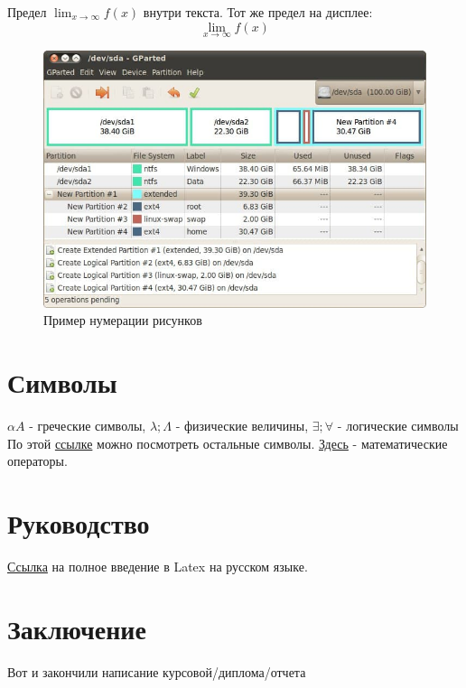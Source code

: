     Предел \(\lim_{x\to\infty} f(x)\) внутри текста.
    Тот же предел на дисплее:
    \[
    \lim_{x\to\infty} f(x)
    \]
\begin{figure}[!htb]
	\centering
	\includegraphics[width=\textwidth]{Images/image2.jpg}
	\caption{Пример нумерации рисунков}
	\label{fig:image2}
\end{figure}

\section{Символы}
$\alpha A$ - греческие символы,  $ \lambda; \Lambda$ - физические величины, $\exists; \forall$ - логические символы\\
По этой   \href{https://www.overleaf.com/learn/latex/List_of_Greek_letters_and_math_symbols}{ссылке} можно посмотреть остальные символы. \href{https://www.overleaf.com/learn/latex/Operators}{Здесь} - математические операторы.


\section{Руководство}
\href{https://www.texlive.info/CTAN/info/lshort/russian/lshortru.pdf}{Ссылка} на полное введение в Latex на русском языке.


\section{Заключение}
Вот и закончили написание курсовой/диплома/отчета



